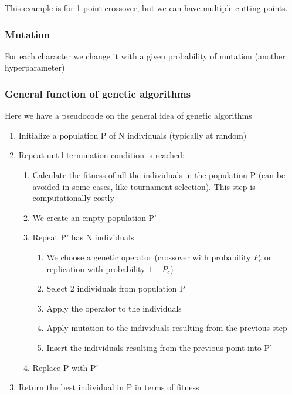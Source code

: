 This example is for 1-point crossover, but we can have multiple cutting points. 


\subsubsection{Mutation}

For each character we change it with a given probability of mutation (another hyperparameter)


\subsubsection{General function of genetic algorithms}

Here we have a pseudocode on the general idea of genetic algorithms

\begin{enumerate}
    \item Initialize a population P of N individuals (typically at random)
    

    \item Repeat until termination condition is reached:
    

    \begin{enumerate}
        \item Calculate the fitness of all the individuals in the population P (can be avoided in some cases, like tournament selection). This step is computationally costly
        \item We create an empty population P'
        \item Repeat P' has N individuals
        \begin{enumerate}
            \item We choose a genetic operator (crossover with probability $P_c$ or replication with probability $1-P_c$)
            \item Select 2 individuals from population P 
            \item Apply the operator to the individuals 
            \item Apply mutation to the individuals resulting from the previous step 
            \item Insert the individuals resulting from the previous point into P' 
        \end{enumerate}
        \item Replace P with P'
    \end{enumerate}
    \item Return the best individual in P in terms of fitness
\end{enumerate}



